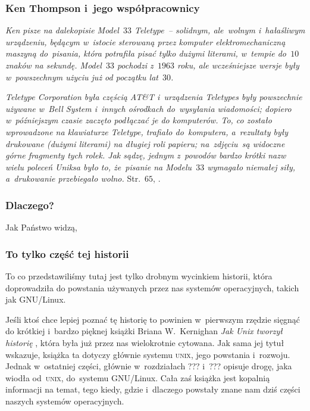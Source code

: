 \documentclass[10pt,t]{beamer}
\begin{document}
\begin{frame}
  \frametitle{Ken Thompson i~jego współpracownicy}


  \textit{Ken pisze na dalekopisie Model~$33$ Teletype~-- solidnym,
    ale~wolnym i~hałaśliwym urządzeniu, będącym w~istocie sterowaną przez
    komputer elektromechaniczną maszyną do~pisania, która potrafiła pisać
    tylko dużymi literami, w~tempie do~$10$ znaków na sekundę. Model~$33$
    pochodzi z~$1963$ roku, ale wcześniejsze wersje były w~powszechnym
    użyciu już od początku lat~$30$.}

  \textit{Teletype Corporation była częścią AT\&T i~urządzenia Teletypes
    były powszechnie używane w~Bell System i~innych ośrodkach
    do~wysyłania wiadomości; dopiero w~późniejszym czasie zaczęto
    podłączać je do komputerów. To, co zostało wprowadzone na klawiaturze
    Teletype, trafiało do~komputera, a~rezultaty były drukowane (dużymi
    literami) na długiej roli papieru; na~zdjęciu~są widoczne górne
    fragmenty tych rolek. Jak sądzę, jednym z~powodów bardzo krótki
    nazw wielu poleceń Uniksa było to, że~pisanie na Modelu~$33$ wymagało
    niemałej siły, a~drukowanie przebiegało wolno.}
  Str.~$65$, \parencite{Kernighan-Jak-Unix-tworzyl-historie-Pub-2021}.

\end{frame}






\begin{frame}
  \frametitle{Dlaczego?}


  Jak Państwo widzą,

\end{frame}





\begin{frame}
  \frametitle{To tylko część tej historii}


  To co przedstawiliśmy tutaj jest tylko drobnym wycinkiem historii, która
  doprowadziła do powstania używanych przez nas systemów operacyjnych,
  takich jak GNU/Linux.

  Jeśli ktoś chce lepiej poznać tę historię to powinien w~pierwszym rzędzie
  sięgnąć do krótkiej i~bardzo pięknej książki Briana W.~Kernighan
  \textit{Jak Unix tworzył historię}
  \parencite{Kernighan-Jak-Unix-tworzyl-historie-Pub-2021}, która była
  już przez nas wielokrotnie cytowana. Jak sama jej tytuł wskazuje, książka
  ta dotyczy głównie systemu \textsc{unix}, jego powstania i~rozwoju. Jednak
  w~ostatniej części, głównie w~rozdziałach ??? i~??? opisuje drogę, jaka
  wiodła od~\textsc{unix}, do~systemu GNU/Linux. Cała zaś książka jest
  kopalnią informacji na temat, tego kiedy, gdzie i~dlaczego powstały znane
  nam dziś części naszych systemów operacyjnych.

\end{frame}
\end{document}
